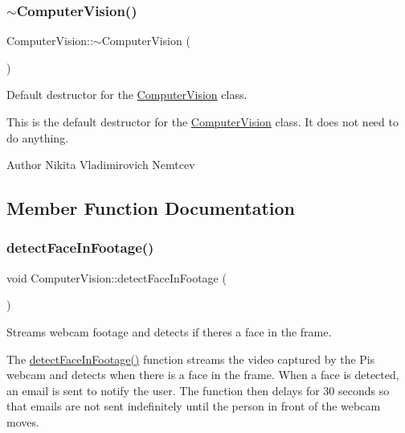 \subsubsection{\texorpdfstring{$\sim$\+Computer\+Vision()}{~ComputerVision()}}
{\footnotesize\ttfamily Computer\+Vision\+::$\sim$\+Computer\+Vision (\begin{DoxyParamCaption}{ }\end{DoxyParamCaption})}



Default destructor for the \hyperlink{classComputerVision}{Computer\+Vision} class. 

This is the default destructor for the \hyperlink{classComputerVision}{Computer\+Vision} class. It does not need to do anything.

\begin{DoxyAuthor}{Author}
Nikita Vladimirovich Nemtcev 
\end{DoxyAuthor}


\subsection{Member Function Documentation}
\mbox{\label{classComputerVision_abe0c3d02170f802d0bea5934d359105f}} 
\subsubsection{\texorpdfstring{detect\+Face\+In\+Footage()}{detectFaceInFootage()}}
{\footnotesize\ttfamily void Computer\+Vision\+::detect\+Face\+In\+Footage (\begin{DoxyParamCaption}{ }\end{DoxyParamCaption})}



Streams webcam footage and detects if theres a face in the frame. 

The \hyperlink{classComputerVision_abe0c3d02170f802d0bea5934d359105f}{detect\+Face\+In\+Footage()} function streams the video captured by the Pi\textquotesingle{}s webcam and detects when there is a face in the frame. When a face is detected, an email is sent to notify the user. The function then delays for 30 seconds so that emails are not sent indefinitely until the person in front of the webcam moves.

